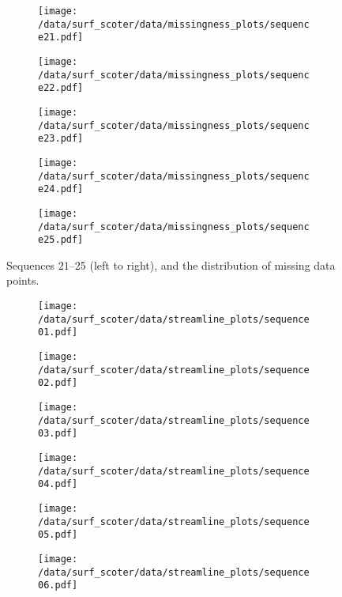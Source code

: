\begin{figure}[b]
	\begin{subfigure}[b]{0.2\textwidth}
		\texttt{[image: /data/surf\_scoter/data/missingness\_plots/sequence21.pdf]}
	\end{subfigure}%
	\begin{subfigure}[b]{0.2\textwidth}
		\texttt{[image: /data/surf\_scoter/data/missingness\_plots/sequence22.pdf]}
	\end{subfigure}%
	\begin{subfigure}[b]{0.2\textwidth}
		\texttt{[image: /data/surf\_scoter/data/missingness\_plots/sequence23.pdf]}
	\end{subfigure}%
	\begin{subfigure}[b]{0.2\textwidth}
		\texttt{[image: /data/surf\_scoter/data/missingness\_plots/sequence24.pdf]}
	\end{subfigure}%
	\begin{subfigure}[b]{0.2\textwidth}
		\texttt{[image: /data/surf\_scoter/data/missingness\_plots/sequence25.pdf]}
	\end{subfigure}%
	\caption{Sequences $21$--25 (left to right), and the distribution of missing data points.}
\end{figure}

\begin{figure}[h]
	\begin{subfigure}[t]{0.5\textwidth}
		\centering
		\texttt{[image: /data/surf\_scoter/data/streamline\_plots/sequence01.pdf]}
	\end{subfigure}%
	\begin{subfigure}[t]{0.5\textwidth}
		\centering
		\texttt{[image: /data/surf\_scoter/data/streamline\_plots/sequence02.pdf]}
	\end{subfigure}
	\begin{subfigure}[t]{0.5\textwidth}
		\centering
		\texttt{[image: /data/surf\_scoter/data/streamline\_plots/sequence03.pdf]}
	\end{subfigure}%
	\begin{subfigure}[t]{0.5\textwidth}
		\centering
		\texttt{[image: /data/surf\_scoter/data/streamline\_plots/sequence04.pdf]}
	\end{subfigure}
	\begin{subfigure}[t]{0.5\textwidth}
		\centering
		\texttt{[image: /data/surf\_scoter/data/streamline\_plots/sequence05.pdf]}
	\end{subfigure}%
	\begin{subfigure}[t]{0.5\textwidth}
		\centering
		\texttt{[image: /data/surf\_scoter/data/streamline\_plots/sequence06.pdf]}
	\end{subfigure}
\end{figure}

